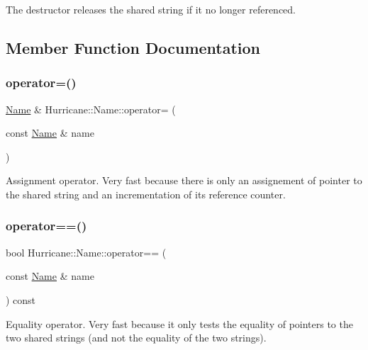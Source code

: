 The destructor releases the shared string if it no longer referenced. 

\subsection{Member Function Documentation}
\mbox{\label{classHurricane_1_1Name_adcd165de286782c011acc31727adb4a1}} 
\subsubsection{\texorpdfstring{operator=()}{operator=()}}
{\footnotesize\ttfamily \hyperlink{classHurricane_1_1Name}{Name} \& Hurricane\+::\+Name\+::operator= (\begin{DoxyParamCaption}\item[{const \hyperlink{classHurricane_1_1Name}{Name} \&}]{name }\end{DoxyParamCaption})}

Assignment operator. Very fast because there is only an assignement of pointer to the shared string and an incrementation of its reference counter. \mbox{\label{classHurricane_1_1Name_a3b728f0b8aa027639ebd47c60addf738}} 
\subsubsection{\texorpdfstring{operator==()}{operator==()}}
{\footnotesize\ttfamily bool Hurricane\+::\+Name\+::operator== (\begin{DoxyParamCaption}\item[{const \hyperlink{classHurricane_1_1Name}{Name} \&}]{name }\end{DoxyParamCaption}) const}

Equality operator. Very fast because it only tests the equality of pointers to the two shared strings (and not the equality of the two strings).

